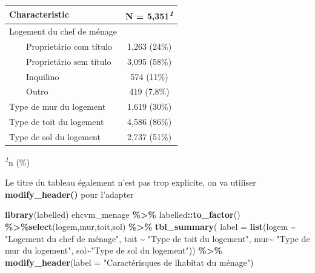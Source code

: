 \documentclass[
]{article}
\newenvironment{Shaded}{\begin{snugshade}}{\end{snugshade}}
\newcommand{\AttributeTok}[1]{\textcolor[rgb]{0.13,0.29,0.53}{#1}}
\newcommand{\FunctionTok}[1]{\textcolor[rgb]{0.13,0.29,0.53}{\textbf{#1}}}
\newcommand{\NormalTok}[1]{#1}
\newcommand{\SpecialCharTok}[1]{\textcolor[rgb]{0.81,0.36,0.00}{\textbf{#1}}}
\newcommand{\StringTok}[1]{\textcolor[rgb]{0.31,0.60,0.02}{#1}}
\begin{document}
\begin{table}[!t]
\fontsize{12.0pt}{14.4pt}\selectfont
\begin{tabular*}{\linewidth}{@{\extracolsep{\fill}}lc}
\toprule
\textbf{Characteristic} & \textbf{N = 5,351}\textsuperscript{\textit{1}} \\ 
\midrule\addlinespace[2.5pt]
Logement du chef de ménage &  \\ 
    Proprietário com título & 1,263 (24\%) \\ 
    Proprietário sem título & 3,095 (58\%) \\ 
    Inquilino & 574 (11\%) \\ 
    Outro & 419 (7.8\%) \\ 
Type de mur du logement & 1,619 (30\%) \\ 
Type de toit du logement & 4,586 (86\%) \\ 
Type de sol du logement & 2,737 (51\%) \\ 
\bottomrule
\end{tabular*}
\begin{minipage}{\linewidth}
\textsuperscript{\textit{1}}n (\%)\\
\end{minipage}
\end{table}

Le titre du tableau également n'est pas trop explicite, on va utiliser
\textbf{modify\_header()} pour l'adapter

\begin{Shaded}
\begin{Highlighting}[]
\FunctionTok{library}\NormalTok{(labelled)}
\NormalTok{ehcvm\_menage }\SpecialCharTok{\%\textgreater{}\%}\NormalTok{ labelled}\SpecialCharTok{::}\FunctionTok{to\_factor}\NormalTok{() }\SpecialCharTok{\%\textgreater{}\%}\FunctionTok{select}\NormalTok{(logem,mur,toit,sol) }\SpecialCharTok{\%\textgreater{}\%} \FunctionTok{tbl\_summary}\NormalTok{( }\AttributeTok{label =} \FunctionTok{list}\NormalTok{(logem }\SpecialCharTok{\textasciitilde{}} \StringTok{"Logement du chef de ménage"}\NormalTok{,}
\NormalTok{ toit }\SpecialCharTok{\textasciitilde{}} \StringTok{"Type de toit du logement"}\NormalTok{,}
\NormalTok{ mur}\SpecialCharTok{\textasciitilde{}} \StringTok{"Type de mur du logement"}\NormalTok{,}
\NormalTok{ sol}\SpecialCharTok{\textasciitilde{}}\StringTok{"Type de sol du logement"}\NormalTok{)) }\SpecialCharTok{\%\textgreater{}\%} \FunctionTok{modify\_header}\NormalTok{(}\AttributeTok{label =} \StringTok{"Caractérisques de l\textquotesingle{}habitat du ménage"}\NormalTok{)}
\end{Highlighting}
\end{Shaded}
\end{document}
